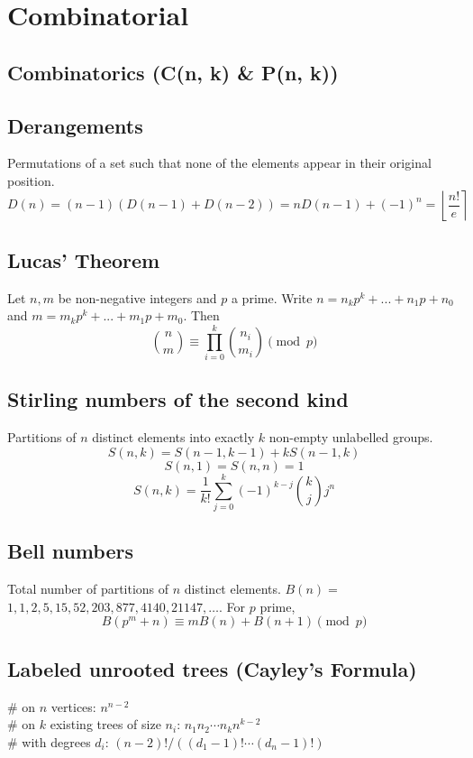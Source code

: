\chapter{Combinatorial}

\section{Combinatorics (C(n, k) \& P(n, k))}
\section{Derangements }
	Permutations of a set such that none of the elements appear in their original position.
	\[ D(n) = (n-1)(D(n-1)+D(n-2)) = n D(n-1)+(-1)^n = \left\lfloor\frac{n!}{e}\right\rceil \]

\section{Lucas' Theorem}
	Let $n,m$ be non-negative integers and $p$ a prime. Write $n=n_kp^k+...+n_1p+n_0$ and $m=m_kp^k+...+m_1p+m_0$. Then 
	\[ \binom{n}{m} \equiv \prod_{i=0}^k\binom{n_i}{m_i} \pmod{p} \]

\section{Stirling numbers of the second kind}
	Partitions of $n$ distinct elements into exactly $k$ non-empty unlabelled groups.
	$$S(n,k) = S(n-1,k-1) + k S(n-1,k)$$
	$$S(n,1) = S(n,n) = 1$$
	$$S(n,k) = \frac{1}{k!}\sum_{j=0}^k (-1)^{k-j}\binom{k}{j}j^n$$

\section{Bell numbers}
	Total number of partitions of $n$ distinct elements. $B(n) =$
	$1, 1, 2, 5, 15, 52, 203, 877, 4140, 21147, \dots$. For $p$ prime,
	\[ B(p^m+n)\equiv mB(n)+B(n+1) \pmod{p} \]

\section{Labeled unrooted trees (Cayley's Formula)}
	\# on $n$ vertices: $n^{n-2}$ \\
	\# on $k$ existing trees of size $n_i$: $n_1n_2\cdots n_k n^{k-2}$ \\
	\# with degrees $d_i$: $(n-2)! / ((d_1-1)! \cdots (d_n-1)!)$

